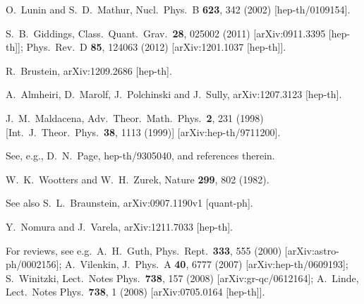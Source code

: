 \documentclass[12pt]{article}
\begin{document}
\begin{thebibliography}{99}
O.~Lunin and S.~D.~Mathur,
Nucl.\ Phys.\ B {\bf 623}, 342 (2002)
[hep-th/0109154].

S.~B.~Giddings,
Class.\ Quant.\ Grav.\  {\bf 28}, 025002 (2011)
[arXiv:0911.3395 [hep-th]];
Phys.\ Rev.\ D {\bf 85}, 124063 (2012)
[arXiv:1201.1037 [hep-th]].

R.~Brustein,
arXiv:1209.2686 [hep-th].

A.~Almheiri, D.~Marolf, J.~Polchinski and J.~Sully,
arXiv:1207.3123 [hep-th].

J.~M.~Maldacena,
Adv.\ Theor.\ Math.\ Phys.\  {\bf 2}, 231 (1998)
[Int.\ J.\ Theor.\ Phys.\  {\bf 38}, 1113 (1999)]
[arXiv:hep-th/9711200].

See, e.g.,
D.~N.~Page,
hep-th/9305040,
and references therein.

W.~K.~Wootters and W.~H.~Zurek,
Nature {\bf 299}, 802 (1982).

See also
S.~L.~Braunstein,
arXiv:0907.1190v1 [quant-ph].

Y.~Nomura and J.~Varela,
arXiv:1211.7033 [hep-th].

For reviews, see e.g.\
A.~H.~Guth,
Phys.\ Rept.\ {\bf 333}, 555 (2000)
[arXiv:astro-ph/0002156];
A.~Vilenkin,
J.\ Phys.\ A {\bf 40}, 6777 (2007)
[arXiv:hep-th/0609193];
S.~Winitzki,
Lect.\ Notes Phys.\ {\bf 738}, 157 (2008)
[arXiv:gr-qc/0612164];
A.~Linde,
Lect.\ Notes Phys.\ {\bf 738}, 1 (2008)
[arXiv:0705.0164 [hep-th]].


\end{thebibliography}
\end{document}
